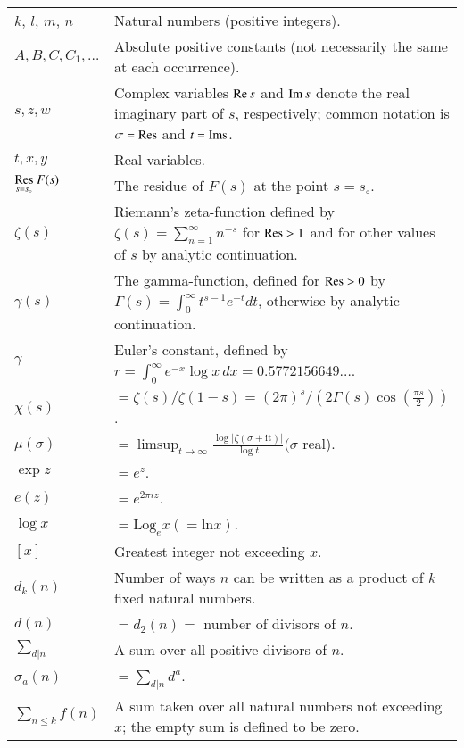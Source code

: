 \medskip
\noindent
\begin{longtable}{p{3cm}p{7cm}}
$k$, $l$, $m$, $n$ & Natural numbers (positive integers).\\
$A, B, C, C_1, \ldots$ & Absolute positive constants (not necessarily
  the same at each occurrence).\\
$s, z, w$ & Complex variables $\operatorname{Re} s$ and $\operatorname{Im} s$ denote the real
  imaginary part of $s$, respectively; common notation is
  $\sigma=\operatorname{Res}$ and $t= \operatorname{Ims}$.\\
$t, x, y$ & Real variables.\\
$\displaystyle{\mathop{\operatorname{Res}}_{s= s_\circ}}~ F(s)$ & The residue of
  $F(s)$ at the point $s= s_\circ$.\\
$\zeta (s)$ & Riemann's zeta-function defined by $\zeta(s)=
  \displaystyle{\sum^\infty_{n=1}} n^{-s}$ for $\operatorname{Res} > 1$ and for other
  values of $s$ by analytic continuation.\\
  $\gamma (s)$ & The gamma-function, defined for $\operatorname{Res} > 0$ by
  $\Gamma(s) = \displaystyle{\int^\infty_0} t^{s-1} e^{-t} dt$,
  otherwise by analytic continuation.\\
  $\gamma $ & Euler's constant, defined by $\displaystyle{r =
    \int^\infty_0 e^{-x} \log x\, dx = 0.5772156649}\ldots$. \\
  $\chi (s)$ & $= \zeta(s) /\zeta(1-s)= (2 \pi)^s/(2 \Gamma (s)\cos
  \left(\frac{\pi s}{2} \right))$.\\
  $\mu(\sigma)$ & $\displaystyle{= \mathop{\lim\sup}_{t \to \infty}
    \frac{\log \big | \zeta (\sigma + \text{it})\big|}{\log t}}
    (\sigma$ real).\\
  $\exp z$ & $= e^z$.\\
  $e (z)$ & $= e^{2 \pi iz}$.\\
  $\log x$ & $= \text{Log}_e x (= \text{ln} x)$.\\
  $[x]$ & Greatest integer not exceeding $x$.\\
  $d_k (n)$ & Number of ways $n$ can be written as a product of $k$
  fixed natural numbers.\\
  $d(n)$ & $= d_2 (n) =$ number of divisors of $n$.\\
  $\displaystyle{\sum_{d \big| n}}$ & A sum over all positive divisors
  of $n$.\\
  $\sigma_a (n)$ & $= \displaystyle{\sum_{d \big | n} d^a}$.\\
  $\displaystyle{\sum_{n \leq k} f(n)}$ & A sum taken over all natural
  numbers not exceeding $x$; the empty sum is defined to be zero.\\

\end{longtable}
